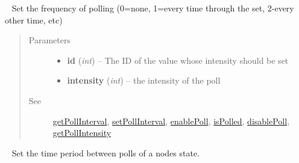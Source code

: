 \documentclass[letterpaper,10pt,english]{sphinxmanual}
\begin{document}
\begin{fulllineitems}
\begin{fulllineitems}
\begin{quote}
\begin{description}
\end{description}\end{quote}

\end{fulllineitems}


\begin{fulllineitems}
\label{libopenzwave:libopenzwave.PyManager.setPollIntensity}~\label{libopenzwave:setpollintensity}
Set the frequency of polling (0=none, 1=every time through the set, 2-every other time, etc)
\begin{quote}\begin{description}
\item[{Parameters}] \leavevmode\begin{itemize}
\item {} 
\textbf{id} (\emph{int}) -- The ID of the value whose intensity should be set

\item {} 
\textbf{intensity} (\emph{int}) -- the intensity of the poll

\end{itemize}

\item[{See}] \leavevmode
{\hyperref[libopenzwave:getpollinterval]{getPollInterval}}, {\hyperref[libopenzwave:setpollinterval]{setPollInterval}}, {\hyperref[libopenzwave:enablepoll]{enablePoll}}, {\hyperref[libopenzwave:ispolled]{isPolled}}, {\hyperref[libopenzwave:disablepoll]{disablePoll}}, {\hyperref[libopenzwave:getpollintensity]{getPollIntensity}}

\end{description}\end{quote}

\end{fulllineitems}


\begin{fulllineitems}
\label{libopenzwave:libopenzwave.PyManager.setPollInterval}~\label{libopenzwave:setpollinterval}
Set the time period between polls of a nodes state.


\end{fulllineitems}
\end{fulllineitems}
\end{document}
